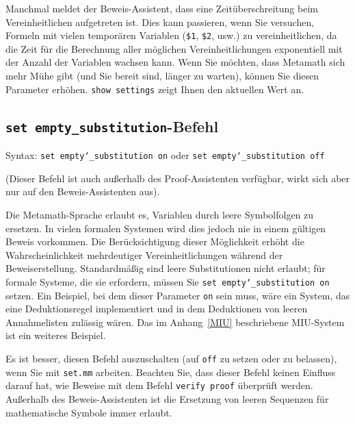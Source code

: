 Manchmal meldet der Beweis-Assistent, dass eine Zeitüberschreitung beim Vereinheitlichen aufgetreten ist.  Dies kann passieren, wenn Sie versuchen, Formeln mit vielen temporären Variablen (\texttt{\$1}, \texttt{\$2}, usw.) zu vereinheitlichen, da die Zeit für die Berechnung aller möglichen Vereinheitlichungen exponentiell mit der Anzahl der Variablen wachsen kann.  Wenn Sie möchten, dass Metamath sich mehr Mühe gibt (und Sie bereit sind, länger zu warten), können Sie diesen Parameter erhöhen.  \texttt{show settings} zeigt Ihnen den aktuellen Wert an.


\subsection{\texttt{set empty\_substitution}-Befehl}

\begin{flushleft}
Syntax:  \texttt{set empty{\char`\_}substitution on} oder \texttt{set
empty{\char`\_}substitution off}
\end{flushleft}

(Dieser Befehl ist auch außerhalb des Proof-Assistenten verfügbar, wirkt sich aber nur auf den Beweis-Assistenten aus).

Die Metamath-Sprache erlaubt es, Variablen durch leere Symbolfolgen zu ersetzen.  In vielen formalen Systemen wird dies jedoch nie in einem gültigen Beweis vorkommen.  Die Berücksichtigung dieser Möglichkeit erhöht die Wahrscheinlichkeit mehrdeutiger Vereinheitlichungen während der Beweiserstellung. Standardmäßig sind leere Substitutionen nicht erlaubt; für formale Systeme, die sie erfordern, müssen Sie \texttt{set empty{\char`\_}substitution on} setzen. Ein Beispiel, bei dem dieser Parameter \texttt{on} sein muss, wäre ein System, das eine Deduktionsregel implementiert und in dem Deduktionen von leeren Annahmelisten zulässig wären.  Das im Anhang~\ref{MIU} beschriebene MIU-System ist ein weiteres Beispiel.

Es ist besser, diesen Befehl auszuschalten (auf \texttt{off} zu setzen oder zu belassen), wenn Sie mit \texttt{set.mm} arbeiten. Beachten Sie, dass dieser Befehl keinen Einfluss darauf hat, wie Beweise mit dem Befehl \texttt{verify proof} überprüft werden.  Außerhalb des Beweis-Assistenten ist die Ersetzung von leeren Sequenzen für mathematische Symbole immer erlaubt.


